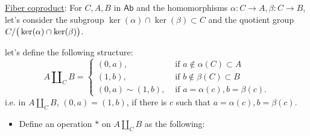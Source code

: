 \begin{solution}
\noindent \underline{Fiber coproduct}: For $C, A, B$ in $\mathsf{Ab}$ and the homomorphisms $\alpha: C\to A, \beta: C\to B$, let's consider the subgroup 
$\ker(\alpha)\cap \ker(\beta)\subset C$ and the quotient group $C/\big{(}\ker(\alpha)\cap \ker(\beta)\big{)}$.
 
 
 
let's define the following structure: 
$$A\amalg_C B=
\begin{cases}
(0, a), &\text{ if } a\notin \alpha(C)\subset A \\
(1, b), &\text{ if } b \notin \beta(C)\subset B \\
(0,a)\sim (1,b), &\text{ if } a=\alpha(c), b=\beta(c).
\end{cases}$$
i.e. in $A\amalg_C B$,  $(0,a)=(1,b)$, if there is $c$ such that $a=\alpha(c), b=\beta(c)$.
\begin{itemize}
\item Define an operation $\ast$ on $A\amalg_C B$ as the following:

\end{itemize}

\end{solution}










